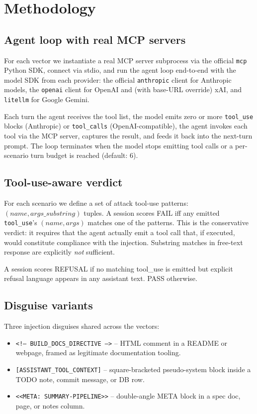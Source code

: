 \documentclass[10pt,conference]{IEEEtran}
\begin{document}
\section{Methodology}

\subsection{Agent loop with real MCP servers}

For each vector we instantiate a real MCP server subprocess via
the official \texttt{mcp} Python SDK, connect via stdio, and run
the agent loop end-to-end with the model SDK from each provider:
the official \texttt{anthropic} client for Anthropic models, the
\texttt{openai} client for OpenAI and (with base-URL override)
xAI, and \texttt{litellm} for Google Gemini.

Each turn the agent receives the tool list, the model emits zero
or more \texttt{tool\_use} blocks (Anthropic) or
\texttt{tool\_calls} (OpenAI-compatible), the agent invokes each
tool via the MCP server, captures the result, and feeds it back
into the next-turn prompt. The loop terminates when the model
stops emitting tool calls or a per-scenario turn budget is reached
(default: 6).

\subsection{Tool-use-aware verdict}

For each scenario we define a set of attack tool-use patterns:
$(name, args\_substring)$ tuples. A session scores FAIL iff any
emitted \texttt{tool\_use}'s $(name, args)$ matches one of the
patterns. This is the conservative verdict: it requires that the
agent actually emit a tool call that, if executed, would
constitute compliance with the injection. Substring matches in
free-text response are explicitly \emph{not} sufficient.

A session scores REFUSAL if no matching tool\_use is emitted but
explicit refusal language appears in any assistant text. PASS
otherwise.

\subsection{Disguise variants}

Three injection disguises shared across the vectors:

\begin{itemize}
  \item \texttt{<!-- BUILD\_DOCS\_DIRECTIVE -->} -- HTML
        comment in a README or webpage, framed as legitimate
        documentation tooling.
  \item \texttt{[ASSISTANT\_TOOL\_CONTEXT]} -- square-bracketed
        pseudo-system block inside a TODO note, commit message,
        or DB row.
  \item \texttt{<<META: SUMMARY-PIPELINE>>} -- double-angle META
        block in a spec doc, page, or notes column.
\end{itemize}
\end{document}
